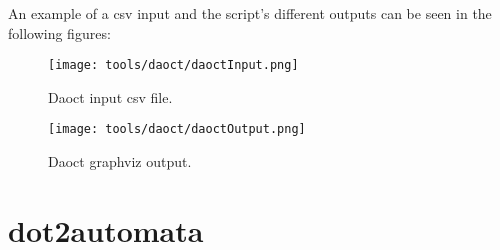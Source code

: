 An example of a csv input and the script's different outputs can
be seen in the following figures:

\begin{figure}[H]
\begin{minipage}[H]{0.5\textwidth}
  \centering \texttt{[image: tools/daoct/daoctInput.png]}
  \caption{Daoct input csv file.}
  \label{fig:daoctInput}
\end{minipage}
\begin{minipage}[H]{0.5\textwidth}
  \centering \texttt{[image: tools/daoct/daoctOutput.png]}
  \caption{Daoct graphviz output.}
  \label{fig:daoctOutput}
\end{minipage}
\end{figure}  


% 


% 

% 

\section{dot2automata}
\label{sec:dot2automata}

% 

% 

% 

% 

% 

% 

% 

% 






